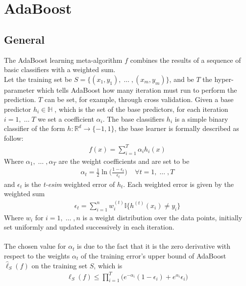 
\chapter{AdaBoost}
\section{General}
	The AdaBoost learning meta-algorithm $f$ combines the results of a sequence of basic classifiers with a weighted sum. \\
	Let the training set be $S=\lbrace (x_{1}, y_{1}),\; \dots\;, (x_{m}, y_{m}) \rbrace$, and be $T$ the hyper-parameter which tells AdaBoost how many iteration must run to perform the prediction. $T$ can be set, for example, through cross validation. Given a base predictor $h_{i} \in \mathbb{H}\;$, which is the set of the base predictors, for each iteration $i = 1,\;\dots\;T$ we set a coefficient $\alpha_{i}$. The base classifiers $h_{i}$ is a simple binary classifier of the form $h:\mathbb{R}^{d}\to\lbrace-1, 1\rbrace$, the base learner is formally described as follow:
	\begin{align}
	\label{eq:weighted_sum}
		f(x) = \sum_{i=1}^{T}\alpha_{i}h_{i}(x)
	\end{align}
	Where $\alpha_{1},\;\dots\;,\alpha_{T}$ are the weight coefficients and are set to be
	\begin{align*}
		\alpha_{t} = \frac{1}{2}\ln \Big( \frac{1-\epsilon_{t}}{\epsilon_{t}} \Big) \;\;\;\; \forall t=1,\;\dots\;,T
	\end{align*}
	and $\epsilon_{t}$ is the \textit{t-esim} weighted error of $h_{t}$. Each weighted error is given by the weighted sum
	\begin{align*}
		\epsilon_{t} = \sum_{i=1}^{n} w_{i}^{(t)}\mathbb{I}\big\lbrace h^{(t)}(x_{i}) \neq y_{i} \big\rbrace
	\end{align*}
	Where $w_{i}$ for $i = 1,\;\dots\;, n$ is a weight distribution over the data points, initially set uniformly and updated successively in each iteration.\\\\
	The chosen value for $\alpha_{t}$ is due to the fact that it is the zero derivative with respect to the weights $\alpha_{t}$ of the training error's upper bound of AdaBoost $\hat{\ell}_{S}(f)$ on the training set $S$, which is
	\begin{align*}
		\hat{\ell}_{S}(f) \leq \prod_{i=1}^{T}\big( e^{-\alpha_{i}}(1-\epsilon_{i}) + e^{\alpha_{i}}\epsilon_{i} \big)
	\end{align*}
	
